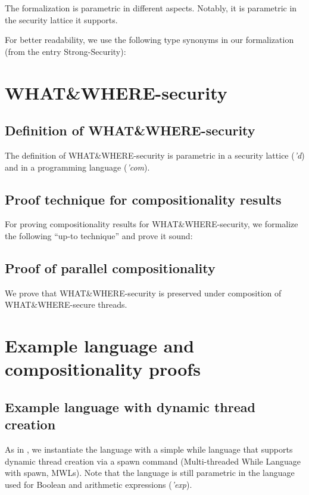 \documentclass[11pt,a4paper]{article}
\begin{document}
The formalization is parametric in different aspects. Notably, it is
parametric in the security lattice it supports. 

For better readability, we use the following type synonyms in our
formalization (from the entry Strong-Security):



\section{WHAT\&WHERE-security}

\subsection{Definition of WHAT\&WHERE-security}

The definition of WHAT\&WHERE-security is parametric in a security
lattice (\textit{'d}) and in a programming language (\textit{'com}).




\subsection{Proof technique for compositionality results}

For proving compositionality results for WHAT\&WHERE-security, we formalize
the following ``up-to technique'' and prove it sound:




\subsection{Proof of parallel compositionality}

We prove that WHAT\&WHERE-security is preserved under composition of
WHAT\&WHERE-secure threads.




\section{Example language and compositionality proofs}

\subsection{Example language with dynamic thread creation}

As in \cite{scheduler-independent}, we instantiate the language
with a simple while language that supports dynamic thread creation via
a spawn command (Multi-threaded While Language with spawn, MWLs). Note
that the language is still parametric in the language used for Boolean
and arithmetic expressions (\textit{'exp}).
\end{document}
